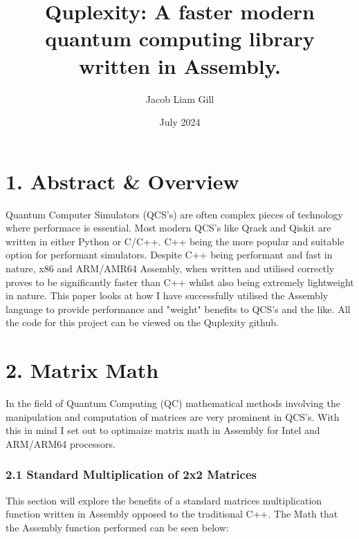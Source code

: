 \documentclass{article}
\title{Quplexity: A faster modern quantum computing library \\ written in Assembly.}
\author{Jacob Liam Gill}
\date{July 2024}
\begin{document}
\maketitle

\section*{1. Abstract \& Overview}
Quantum Computer Simulators (QCS's) are often complex pieces of technology where performace is essential.
Most modern QCS's like Qrack and Qiskit are written in either Python or C/C++.
C++ being the more popular and suitable option for performant simulators. Despite C++ being performant and fast in nature, 
x86 and ARM/AMR64 Assembly, when written and utilised correctly proves to be significantly faster than C++ whilst also being extremely lightweight in nature.
This paper looks at how I have successfully utilised the Assembly language to provide performance and "weight" benefits to QCS's and the like. All the code for this project can be viewed on the Quplexity github.

\section*{2. Matrix Math}
In the field of Quantum Computing (QC) mathematical methods involving the manipulation and computation of matrices are very prominent in QCS's.
With this in mind I set out to optimaize matrix math in Assembly for Intel and ARM/ARM64 processors. 

\subsubsection*{2.1 Standard Multiplication of 2x2 Matrices}
This section will explore the benefits of a standard matrices multiplication function written in Assembly opposed to the traditional C++.
The Math that the Assembly function performed can be seen below: \\
\end{document}

